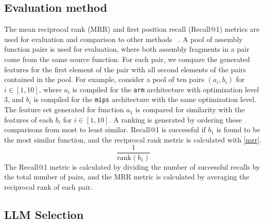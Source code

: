 \subsection{Evaluation method}

The mean reciprocal rank (MRR) and first position recall (Recall@1) metrics are used for evaluation and comparison to other methods
~\cite{deprio,code-not-lang,Asm2Vec,CLAP,SAFE}.
A pool of assembly function pairs is used for evaluation, where both assembly fragments in a pair come from the same source function.
For each pair, we compare the generated features for the first element of the pair with all second elements of the pairs contained
in the pool.  For example, consider a pool of ten pairs \((a_i, b_i)\) for \(i \in [1, 10]\), where \(a_i\) is compiled for the \texttt{arm}
architecture with optimization level \(3\), and \(b_i\) is compiled for the \texttt{mips} architecture with the same optimization
level. The feature set generated for function \(a_1\) is compared for similarity with the features of each \(b_i\) for \(i \in [1, 10]\).
A ranking is generated by ordering these comparisons from most to least similar. Recall@1 is successful
if \(b_1\) is found to be the most similar function, and the reciprocal rank metric is calculated with \autoref{mrr}.
\begin{equation} \label{mrr}
\frac{1}{\text{rank}(b_1)}
\end{equation}
\noindent The Recall@1 metric is calculated by dividing the number of successful recalls by the total number of pairs, and the
MRR metric is calculated by averaging the reciprocal rank of each pair.

\subsection{LLM Selection}

